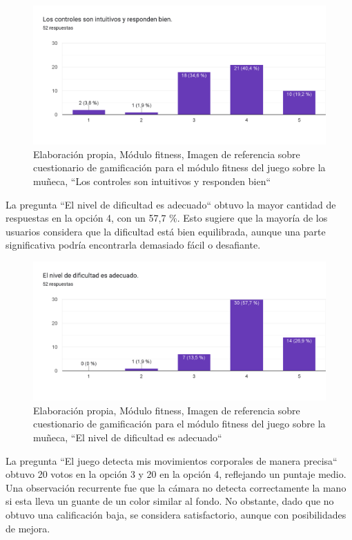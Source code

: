     \begin{figure}[H]
  \centering
  \includegraphics[width=0.7\linewidth]{Imagenes/fc2.png}
  \caption{Elaboración propia, Módulo fitness, Imagen de referencia sobre cuestionario  de gamificación para el módulo fitness del juego sobre la muñeca,  ``Los controles son intuitivos y responden bien``}
  \label{fig:cuestionario2fitness}
\end{figure}
La pregunta ``El nivel de dificultad es adecuado`` obtuvo la mayor cantidad de respuestas en la opción 4, con un 57,7 \%. Esto sugiere que la mayoría de los usuarios considera que la dificultad está bien equilibrada, aunque una parte significativa podría encontrarla demasiado fácil o desafiante.

 \begin{figure}[H]
  \centering
  \includegraphics[width=0.7\linewidth]{Imagenes/fc3.png}
  \caption{Elaboración propia, Módulo fitness, Imagen de referencia sobre cuestionario  de gamificación para el módulo fitness del juego sobre la muñeca,  ``El nivel de dificultad es adecuado``}
  \label{fig:cuestionario3fitness}
\end{figure}

La pregunta ``El juego detecta mis movimientos corporales de manera precisa`` obtuvo 20 votos en la opción 3 y 20 en la opción 4, reflejando un puntaje medio. Una observación recurrente fue que la cámara no detecta correctamente la mano si esta lleva un guante de un color similar al fondo. No obstante, dado que no obtuvo una calificación baja, se considera satisfactorio, aunque con posibilidades de mejora.


